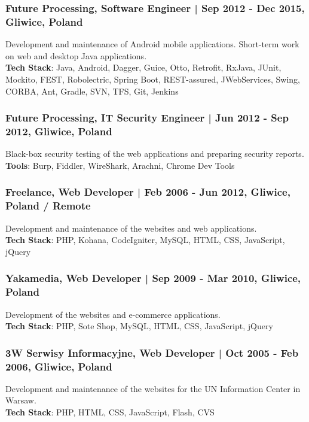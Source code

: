 \documentclass[8pt]{extarticle}
\begin{document}
      \subsubsection*{\normalsize{Future Processing, Software Engineer | Sep 2012 - Dec 2015, Gliwice, Poland}}
      Development and maintenance of Android mobile applications. Short-term work on web and desktop Java applications.\\
      \textbf{Tech Stack}: Java, Android, Dagger, Guice, Otto, Retrofit, RxJava,
      JUnit, Mockito, FEST, Robolectric, Spring Boot, REST-assured, JWebServices,
      Swing, CORBA, Ant, Gradle, SVN, TFS, Git, Jenkins

      \subsubsection*{\normalsize{Future Processing, IT Security Engineer | Jun 2012 - Sep 2012, Gliwice, Poland}}
      Black-box security testing of the web applications and preparing security reports.\\
      \textbf{Tools}: Burp, Fiddler, WireShark, Arachni, Chrome Dev Tools

      \subsubsection*{\normalsize{Freelance, Web Developer | Feb 2006 - Jun 2012, Gliwice, Poland / Remote}}
      Development and maintenance of the websites and web applications.\\
      \textbf{Tech Stack}: PHP, Kohana, CodeIgniter, MySQL, HTML, CSS, JavaScript, jQuery

      \subsubsection*{\normalsize{Yakamedia, Web Developer | Sep 2009 - Mar 2010, Gliwice, Poland}}
      Development of the websites and e-commerce applications.\\
      \textbf{Tech Stack}: PHP, Sote Shop, MySQL, HTML, CSS, JavaScript, jQuery

      \subsubsection*{\normalsize{3W Serwisy Informacyjne, Web Developer | Oct 2005 - Feb 2006, Gliwice, Poland}}
      Development and maintenance of the websites for the UN Information Center in Warsaw.\\
      \textbf{Tech Stack}: PHP, HTML, CSS, JavaScript, Flash, CVS
\end{document}
